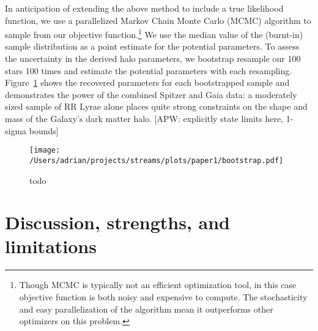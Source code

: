 \documentclass{emulateapj}
\begin{document}
In anticipation of extending the above method to include a true
likelihood function, we use a parallelized Markov Chain Monte Carlo
(MCMC) algorithm \citep{foremanmackey2013} to sample from our
objective function.\footnote{Though MCMC is typically not an efficient
  optimization tool, in this case objective function is both noisy and
  expensive to compute. The stochasticity and easy parallelization of
  the algorithm mean it outperforms other optimizers on this problem.}
We use the median value of the (burnt-in) sample distribution as a
point estimate for the potential parameters. To assess the uncertainty
in the derived halo parameters, we bootstrap resample our 100 stars
100 times and estimate the potential parameters with each
resampling. Figure~\ref{fig:bootstrap} shows the recovered parameters
for each bootstrapped sample and demonstrates the power of the
combined Spitzer and Gaia data: a moderately sized sample of RR Lyrae
alone places quite strong constraints on the shape and mass of the
Galaxy's dark matter halo. [APW: explicitly state limits here, 1-sigma bounds]

\begin{figure}[h]
\begin{center}
\texttt{[image: /Users/adrian/projects/streams/plots/paper1/bootstrap.pdf]}
\caption{ todo }\label{fig:bootstrap}
\end{center}
\end{figure}


\section{Discussion, strengths, and limitations}
\label{sec:discussion}
\end{document}
